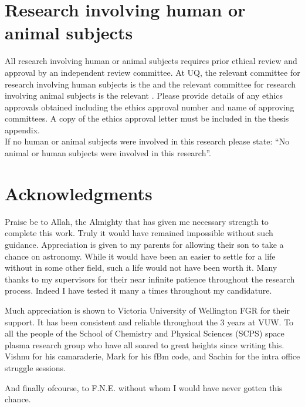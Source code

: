 



\section*{Research involving human or animal subjects}

\begin{instructional}
	All research involving human or animal subjects requires prior ethical review and approval by an independent review committee. At UQ, the relevant committee for research involving human subjects is the \href{http://www.uq.edu.au/research/integrity-compliance/human-ethics}{\color{blue}{Human Ethics Unit}} and the relevant committee for research involving animal subjects is the relevant \href{http://www.uq.edu.au/research/integrity-compliance/animal-welfare}{\color{blue}{Animal Ethics Committee}}.  Please provide details of any ethics approvals obtained including the ethics approval number and name of approving committees.  A copy of the ethics approval letter must be included in the thesis appendix.\\
    
    \noindent
	If no human or animal subjects were involved in this research please state: ``No animal or human subjects were involved in this research''.
\end{instructional}





\clearpage
\section*{Acknowledgments}

\begin{instructional}
	Praise be to Allah, the Almighty that has given me necessary strength to complete this work. Truly it would have remained impossible without such guidance. Appreciation is given to my parents for allowing their son to take a chance on astronomy. While it would have been an easier to settle for a life without in some other field, such a life would not have been worth it. Many thanks to my supervisors for their near infinite patience throughout the research process. Indeed I have tested it many a times throughout my candidature.
	
	Much appreciation is shown to Victoria University of Wellington FGR for their support. It has been consistent and reliable throughout the 3 years at VUW.
	To all the people of the School of Chemistry and Physical Sciences (SCPS) space plasma research group who have all soared to great heights since writing this. Vishnu for his camaraderie, Mark for his fBm code, and Sachin for the intra office struggle sessions. 
	
	And finally ofcourse, to F.N.E. without whom I would have never gotten this chance.
\end{instructional}

